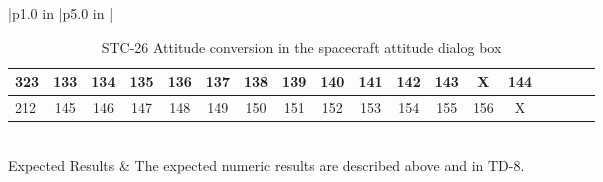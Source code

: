\begin{table}[htbp!]
\begin{tabular}{|p{1.0 in} |p{5.0 in} |}
\begin{centering}
\begin{tabular}{|l|c|c|c|c|c|c|c|c|c|c|c|c|c|c|c|c|c|}
             323 & 133 & 134 & 135 & 136 & 137 & 138 & 139 & 140 & 141 & 142 & 143 & X & 144  \\ \hline
             212 & 145 & 146 & 147 & 148 & 149 & 150 & 151 & 152 & 153 & 154 & 155 & 156 & X  \\ \hline
          \end{tabular}
          \end{centering} \vspace{0.1 in}\\
         \hline
         Expected Results & The expected numeric results are described above and in TD-8.\\
      \hline
\end{tabular}
   \label{Table:STC-26}
   \caption{STC-26 Attitude conversion in the spacecraft attitude dialog box}
\end{table} 